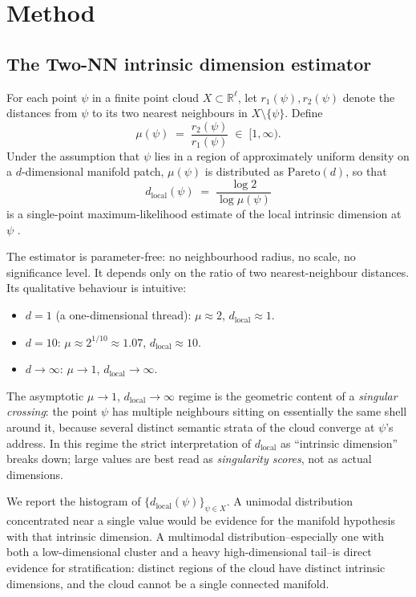 \documentclass[11pt,a4paper]{article}
\theoremstyle{definition}
\newcommand{\dlocal}{d_{\mathrm{local}}}
\begin{document}
\section{Method}
\label{sec:method}

\subsection{The Two-NN intrinsic dimension estimator}

For each point $\psi$ in a finite point cloud $X \subset \mathbb{R}^\ell$,
let $r_1(\psi), r_2(\psi)$ denote the distances from $\psi$ to its two
nearest neighbours in $X \setminus \{\psi\}$. Define
\[
\mu(\psi) \;=\; \frac{r_2(\psi)}{r_1(\psi)} \;\in\; [1, \infty).
\]
Under the assumption that $\psi$ lies in a region of approximately uniform
density on a $d$-dimensional manifold patch, $\mu(\psi)$ is distributed as
$\mathrm{Pareto}(d)$, so that
\begin{equation}
\dlocal(\psi) \;=\; \frac{\log 2}{\log \mu(\psi)}
\label{eq:twonn}
\end{equation}
is a single-point maximum-likelihood estimate of the local intrinsic
dimension at $\psi$ \cite{facco2017two}.

The estimator is parameter-free: no neighbourhood radius, no scale, no
significance level. It depends only on the ratio of two nearest-neighbour
distances. Its qualitative behaviour is intuitive:
\begin{itemize}
\item $d = 1$ (a one-dimensional thread): $\mu \approx 2$, $\dlocal \approx 1$.
\item $d = 10$: $\mu \approx 2^{1/10} \approx 1.07$, $\dlocal \approx 10$.
\item $d \to \infty$: $\mu \to 1$, $\dlocal \to \infty$.
\end{itemize}
The asymptotic $\mu \to 1$, $\dlocal \to \infty$ regime is the geometric
content of a \emph{singular crossing}: the point $\psi$ has multiple
neighbours sitting on essentially the same shell around it, because
several distinct semantic strata of the cloud converge at $\psi$'s
address. In this regime the strict interpretation of $\dlocal$ as
``intrinsic dimension'' breaks down; large values are best read as
\emph{singularity scores}, not as actual dimensions.

We report the histogram of $\{\dlocal(\psi)\}_{\psi \in X}$. A unimodal
distribution concentrated near a single value would be evidence for the
manifold hypothesis with that intrinsic dimension. A multimodal
distribution--especially one with both a low-dimensional cluster and a
heavy high-dimensional tail--is direct evidence for stratification:
distinct regions of the cloud have distinct intrinsic dimensions, and the
cloud cannot be a single connected manifold.
\end{document}
